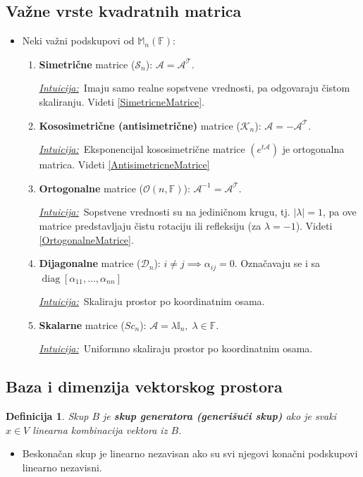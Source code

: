 \documentclass[a4paper,12pt,twoside]{report}
\newtheorem{definition}{Definicija}[section]
\numberwithin{algorithm}{section}
\newcommand{\intuicija}{\noindent\underline{\textit{Intuicija:}}\ }
\begin{document}
\subsection{Važne vrste kvadratnih matrica}
\begin{itemize}
    \item Neki važni podskupovi od $\mathbb{M}_n(\mathbb{F})$:
    \begin{enumerate}
        \item \textbf{Simetrične} matrice ($\mathcal{S}_n$): $\mathcal{A = A^T}$.
        
        \intuicija Imaju samo realne sopstvene vrednosti, pa odgovaraju čistom skaliranju. Videti \ref{SimetricneMatrice}.
        \item \textbf{Kososimetrične (antisimetrične)} matrice ($\mathcal{K}_n$): $\mathcal{A = -A^T}$.
        
        \intuicija Eksponencijal kososimetrične matrice $(e^{t\mathcal{A}})$ je ortogonalna matrica. Videti \ref{AntisimetricneMatrice}
        \item \textbf{Ortogonalne} matrice ($\mathcal{O}(n, \mathbb{F})$): $\mathcal{A}^{-1} = \mathcal{A^T}$.
        
        \intuicija Sopstvene vrednosti su na jediničnom krugu, tj. $|\lambda| = 1$, pa ove matrice predstavljaju čistu rotaciju ili refleksiju (za $\lambda = -1$). Videti \ref{OrtogonalneMatrice}.
        \item \textbf{Dijagonalne} matrice ($\mathcal{D}_n$): $i \neq j \implies \alpha_{ij}=0$. Označavaju se i sa $\operatorname{diag}[\alpha_{11}, \dots, \alpha_{nn}]$
        
        \intuicija Skaliraju prostor po koordinatnim osama.
        \item \textbf{Skalarne} matrice ($Sc_n$): $\mathcal{A} = \lambda \mathbb{I}_n, \; \lambda \in \mathbb{F}$.
        
        \intuicija Uniformno skaliraju prostor po koordinatnim osama.
    \end{enumerate}
\end{itemize}

\subsection{Baza i dimenzija vektorskog prostora}
\label{bazaDimenzija}
\begin{definition}
    Skup $B$ je \textbf{skup generatora (generišući skup)} ako je svaki $x \in V$ linearna kombinacija vektora iz $B$.
\end{definition}
\begin{itemize}
    \item Beskonačan skup je linearno nezavisan ako su svi njegovi konačni podskupovi linearno nezavisni.
\end{itemize}
\end{document}

